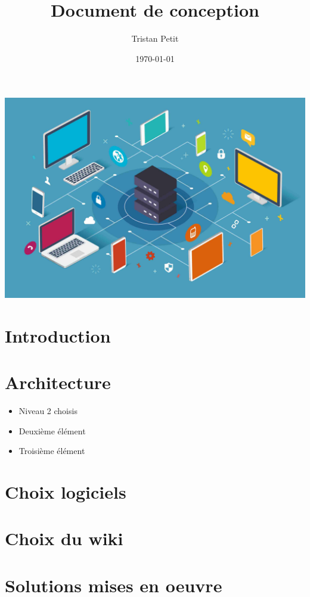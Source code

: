 \documentclass{report}
\begin{document}
\title{Document de conception}
\author{Tristan Petit}
\date{\today}
\maketitle
\begin{center}
    \vspace{1cm} %
    \includegraphics[width=1\textwidth]{images/Logo-project.jpeg} %
\end{center}

\maketitle


\newpage


\renewcommand{\contentsname}{Table des matières}

\tableofcontents

\newpage
{}

\section{Introduction}



\section{Architecture}

\begin{itemize}
    \item Niveau 2 choisis
    \item Deuxième élément
    \item Troisième élément
\end{itemize}

\section{Choix logiciels}


\section{Choix du wiki}


\section{Solutions mises en oeuvre}
\end{document}
